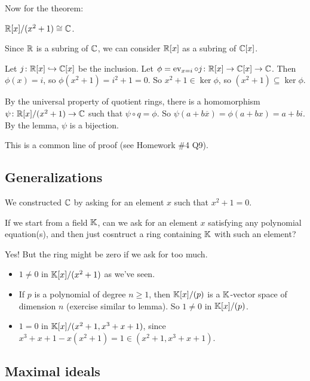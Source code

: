 \documentclass[12pt,letterpaper]{report}
\begin{document}
Now for the theorem:

\begin{thm}{}{}
  $\mathbb{R}[x]/(x^2 + 1) \cong \mathbb{C}$.
\end{thm}

\begin{thmproof}
  Since $\mathbb{R}$ is a subring of $\mathbb{C}$, we can consider $\mathbb{R}[x]$ as a subring of $\mathbb{C}[x]$.

  Let $j \colon \mathbb{R}[x] \hookrightarrow \mathbb{C}[x]$ be the inclusion.
  Let $\phi = \operatorname{ev}_{x = i} \circ j \colon \mathbb{R}[x] \to \mathbb{C}[x] \to \mathbb{C}$.
  Then $\phi(x) = i$, so $\phi(x^2 + 1) = i^2 + 1 = 0$.
  So $x^2 + 1 \in \ker\phi$, so $(x^2 + 1) \subseteq \ker\phi$.

  By the universal property of quotient rings, there is a homomorphism
  $\psi \colon \mathbb{R}[x]/(x^2 + 1) \to \mathbb{C}$ such that $\psi \circ q = \phi$.
  So $\psi(a + b\overline{x}) = \phi(a + bx) = a + bi$.
  By the lemma, $\psi$ is a bijection.
\end{thmproof}

This is a common line of proof (see Homework \#4 Q9).

\pagebreak
\subsection{Generalizations}

We constructed $\mathbb{C}$ by asking for an element $x$ such that $x^2 + 1 = 0$.

If we start from a field $\mathbb{K}$, can we ask for an element $x$ satisfying any polynomial
equation(s), and then just cosntruct a ring containing $\mathbb{K}$ with such an element?

Yes!
But the ring might be zero if we ask for too much.

\begin{ex}
  \begin{itemize}
    \item $1 \neq 0$ in $\mathbb{K}[x]/(x^2 + 1)$ as we've seen.
    \item If $p$ is a polynomial of degree $n \geq 1$, then $\mathbb{K}[x]/(p)$ is a
      $\mathbb{K}$-vector space of dimension $n$ (exercise similar to lemma).
      So $1 \neq 0$ in $\mathbb{K}[x]/(p)$.
    \item $1 = 0$ in $\mathbb{K}[x]/(x^2 + 1, x^3 + x + 1)$, since
      $x^3 + x + 1 - x(x^2 + 1) = 1 \in (x^2 + 1, x^3 + x + 1)$.
  \end{itemize}
\end{ex}

\pagebreak
\subsection{Maximal ideals}
\end{document}
